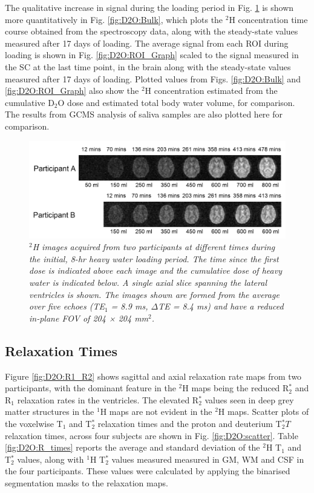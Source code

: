The qualitative increase in signal during the loading period in Fig. \ref{fig:D2O:Load} is shown more quantitatively in Fig. \ref{fig:D2O:Bulk}, which plots the $^2$H concentration time course obtained from the spectroscopy data, along with the steady-state values measured after 17 days of loading. The average signal from each \ac{ROI} during loading is shown in Fig. \ref{fig:D2O:ROI_Graph} scaled to the signal measured in the \ac{SC} at the last time point, in the brain along with the steady-state values measured after 17 days of loading. Plotted values from Figs. \ref{fig:D2O:Bulk} and \ref{fig:D2O:ROI_Graph} also show the $^2$H concentration estimated from the cumulative D$_2$O dose and estimated total body water volume, for comparison. The results from GCMS analysis of saliva samples are also plotted here for comparison.

\begin{figure}[H]
    \centering
    \includegraphics[width=1\textwidth]{Figures/D2O/Loading.png}
    \caption{\textit{$^2$H images acquired from two participants at different times during the initial, 8-hr heavy water loading period. The time since the first dose is indicated above each image and the cumulative dose of heavy water is indicated below. A single axial slice spanning the lateral ventricles is shown. The images shown are formed from the average over five echoes (TE$_1$ = 8.9 ms, $\Delta$TE = 8.4 ms) and have a reduced in-plane \ac{FOV} of 204 × 204 mm$^2$.}}
    \label{fig:D2O:Load}
\end{figure}

\subsection{Relaxation Times}

Figure \ref{fig:D2O:R1_R2} shows sagittal and axial relaxation rate maps from two participants, with the dominant feature in the $^2$H maps being the reduced R$_2^*$ and R$_1$ relaxation rates in the ventricles. The elevated R$_2^*$ values seen in deep grey matter structures in the $^1$H maps are not evident in the $^2$H maps. Scatter plots of the voxelwise T$_1$ and T$_2^*$ relaxation times and the proton and deuterium T$_2^*T$ relaxation times, across four subjects are shown in Fig. \ref{fig:D2O:scatter}. Table \ref{fig:D2O:R_times} reports the average and standard deviation of the $^2$H T$_1$ and T$_2^*$ values, along with $^1$H T$_2^*$ values measured measured in \ac{GM}, \ac{WM} and \ac{CSF} in the four participants. These values were calculated by applying the binarised segmentation masks to the relaxation maps.

